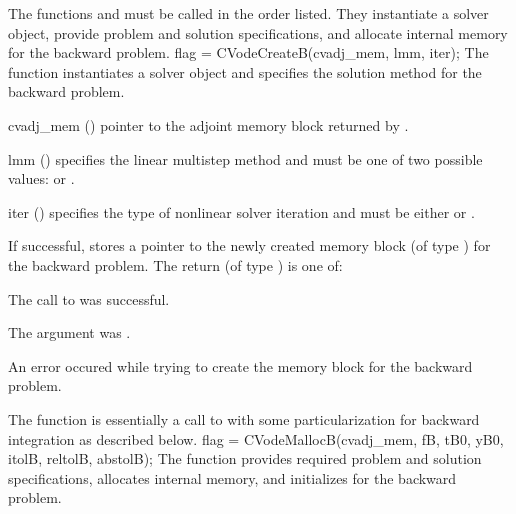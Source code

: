 The functions  and  must be called in the order listed. 
They instantiate a {\cvodes} solver object, provide problem and solution specifications, 
and allocate internal memory for the backward problem.
{
  flag = CVodeCreateB(cvadj\_mem, lmm, iter);
}
{
  The function  instantiates a {\cvodes} solver object and specifies 
  the solution method for the backward problem.
}
{
  \begin{args}
  \item[cvadj\_mem] ()
    pointer to the adjoint memory block returned by .
  \item[lmm] ()
    specifies the linear multistep method and must be one of two
    possible values:  or .     
  \item[iter] ()
    specifies the type of nonlinear solver iteration and must be
    either  or . 
  \end{args}
}
{
  If successful,  stores a pointer to the newly created 
  {\cvodes} memory block (of type ) for the backward problem.
  The return  (of type ) is one of:
  \begin{args}
  \item[\Id{CV\_SUCCESS}]
    The call to  was successful.
  \item[\Id{CV\_ADJMEM\_NULL}]
    The  argument was .
  \item[\Id{CV\_MEM\_FAIL}]
    An error occured while trying to create the {\cvodes} memory block for the backward 
    problem.
  \end{args}
}
{}
The function  is essentially a call to  with some 
particularization for backward integration as described below.
{
  flag = CVodeMallocB(cvadj\_mem, fB, tB0, yB0, itolB, reltolB, abstolB);
}
{
  The function  provides required problem and solution specifications, 
  allocates internal memory, and initializes {\cvodes} for the backward problem.
}
